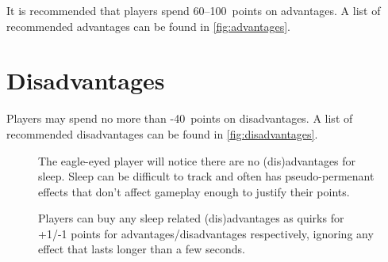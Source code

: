 It is recommended that players spend 60--100~points on advantages. A list of
recommended advantages can be found in \autoref{fig:advantages}.

\section{Disadvantages}
\label{sec:disadvantages}

Players may spend no more than -40~points on disadvantages. A list of
recommended disadvantages can be found in \autoref{fig:disadvantages}.




\begin{figure}[b]
  \centering
  \begin{tcolorbox}[title={Where are the sleep (dis)advantages?}]
    The eagle-eyed player will notice there are no (dis)advantages for sleep.
    Sleep can be difficult to track and often has pseudo-permenant effects that
    don't affect gameplay enough to justify their points.

    Players can buy any sleep related (dis)advantages as quirks for +1/-1 points for
    advantages/disadvantages respectively, ignoring any effect that lasts longer
    than a few seconds.
    
  \end{tcolorbox}
\end{figure}


